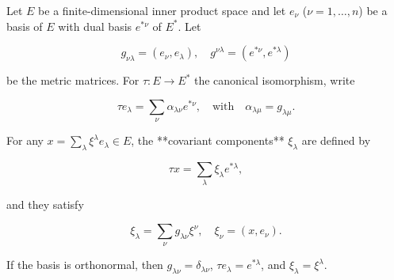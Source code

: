 Let \(E\) be a finite-dimensional inner product space and let \(e_{\nu}\) (\(\nu = 1, \ldots, n\)) be a basis of \(E\) with dual basis \(e^{*\nu}\) of \(E^*\). Let

$$g_{\nu\lambda} = (e_{\nu}, e_{\lambda}), \quad g^{\nu\lambda} = (e^{*\nu}, e^{*\lambda})$$

be the metric matrices. For \(\tau : E \to E^*\) the canonical isomorphism, write

$$\tau e_{\lambda} = \sum_{\nu} \alpha_{\lambda\nu} e^{*\nu}, \quad \text{with} \quad \alpha_{\lambda\mu} = g_{\lambda\mu}.$$

For any \(x = \sum_{\lambda} \xi^{\lambda} e_{\lambda} \in E\), the **covariant components** \(\xi_{\lambda}\) are defined by

$$\tau x = \sum_{\lambda} \xi_{\lambda} e^{*\lambda},$$

and they satisfy

$$\xi_{\lambda} = \sum_{\nu} g_{\lambda\nu} \xi^{\nu}, \quad \xi_{\nu} = (x, e_{\nu}).$$

If the basis is orthonormal, then \(g_{\lambda\nu} = \delta_{\lambda\nu}\), \(\tau e_{\lambda} = e^{*\lambda}\), and \(\xi_{\lambda} = \xi^{\lambda}\).
